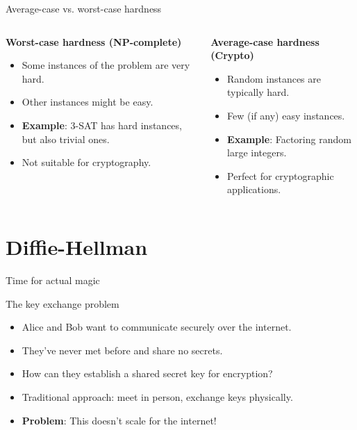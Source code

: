 \documentclass[aspectratio=169, lualatex, handout]{beamer}
\begin{document}
\begin{frame}{Average-case vs. worst-case hardness}
	\begin{columns}[c]
		\begin{column}{0.5\textwidth}
			\textbf{Worst-case hardness (NP-complete)}
			\begin{itemize}[<+->]
				\item Some instances of the problem are very hard.
				\item Other instances might be easy.
				\item \textbf{Example}: 3-SAT has hard instances, but also trivial ones.
				\item Not suitable for cryptography.
			\end{itemize}
		\end{column}
		\begin{column}{0.5\textwidth}
			\textbf{Average-case hardness (Crypto)}
			\begin{itemize}[<+->]
				\item Random instances are typically hard.
				\item Few (if any) easy instances.
				\item \textbf{Example}: Factoring random large integers.
				\item Perfect for cryptographic applications.
			\end{itemize}
		\end{column}
	\end{columns}
	\vspace{0.5cm}
\end{frame}

\section{Diffie-Hellman}

\begin{frame}{Time for actual magic}
\end{frame}

\begin{frame}{The key exchange problem}
	\begin{itemize}[<+->]
		\item Alice and Bob want to communicate securely over the internet.
		\item They've never met before and share no secrets.
		\item How can they establish a shared secret key for encryption?
		\item Traditional approach: meet in person, exchange keys physically.
		\item \textbf{Problem}: This doesn't scale for the internet!
	\end{itemize}
\end{frame}
\end{document}
